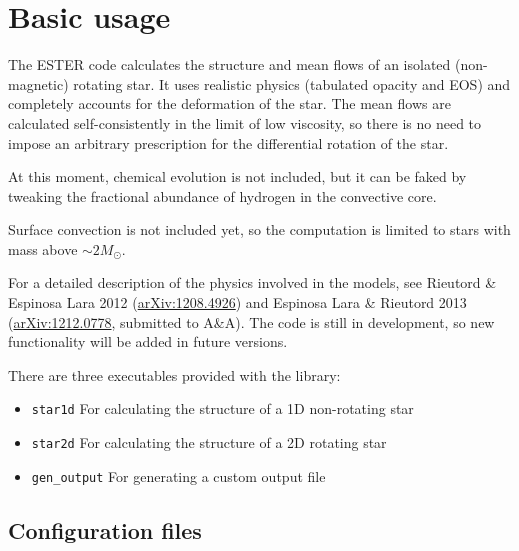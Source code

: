 \chapter{Basic usage}

The ESTER code calculates the structure and mean flows of an isolated (non-magnetic) rotating
star. It uses realistic physics (tabulated opacity and EOS) and completely accounts for
the deformation of the star.
The mean flows are calculated self-consistently in the limit of low viscosity, so there is
no need to impose an arbitrary prescription for the differential rotation of the star.

At this moment, chemical evolution is not included, but it can be faked by tweaking the fractional
abundance of hydrogen in the convective core.

Surface convection is not included yet, so the computation is limited to stars with mass above
$\sim 2 M_\odot$.

For a detailed description of the physics involved in the models, 
see Rieutord \& Espinosa Lara 2012 (\href{http://arxiv.org/abs/1208.4926}{arXiv:1208.4926}) and
Espinosa Lara \& Rieutord 2013 (\href{http://arxiv.org/abs/1212.0778}{arXiv:1212.0778}, submitted to A\&A).
The code is still in development, so new functionality will be added in future versions.

There are three executables provided with the library:
\begin{itemize}
\item {\tt star1d} For calculating the structure of a 1D non-rotating star
\item {\tt star2d} For calculating the structure of a 2D rotating star
\item {\tt gen\_output} For generating a custom output file
\end{itemize}

\section{Configuration files}

